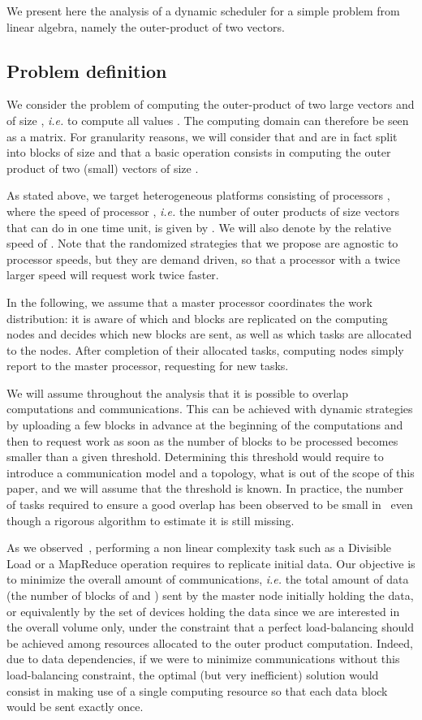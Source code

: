 \documentclass[a4paper,10pt]{article}
\newcommand{\ie}{{\it i.e.}\xspace}
\begin{document}
We present here the analysis of a dynamic scheduler for a simple
problem from linear algebra, namely the outer-product of two vectors.

\subsection{Problem definition}

We consider the problem of computing the outer-product  of two
large vectors  and  of size , \ie to compute all values . The computing domain can
therefore be seen as a matrix. For granularity reasons, we will
consider that  and  are in fact split into  blocks of size
 and that a basic operation consists in computing the outer product
of two (small) vectors of size .

As stated above, we target heterogeneous platforms consisting of 
processors , where the speed of processor , \ie
the number of outer products of size  vectors that  can do in
one time unit, is given by . We will also denote by
 the relative speed of . Note that the randomized strategies that we
propose are agnostic to processor speeds, but they are demand driven,
so that a processor with a twice larger speed will request work twice
faster.

In the following, we assume that a master processor coordinates the
work distribution: it is aware of which  and  blocks are
replicated on the computing nodes and decides which new blocks are
sent, as well as which tasks are allocated to the
nodes. After completion of their allocated tasks, computing nodes
simply report to the master processor, requesting for new tasks.


We will assume throughout the analysis that it is possible to overlap
computations and communications. This can be achieved with dynamic
strategies by uploading a few blocks in advance at the beginning of
the computations and then to request work as soon as the number of
blocks to be processed becomes smaller than a given
threshold. Determining this threshold would require to introduce a
communication model and a topology, what is out of the scope of this
paper, and we will assume that the threshold is known. In practice,
the number of tasks required to ensure a good overlap has been observed to be small
in~\cite{kreaseck2003autonomous,parashar2006autonomic} even though a
rigorous algorithm to estimate it is still missing.

As we observed~\cite{nofreelunch}, performing a non linear complexity
task such as a Divisible Load or a MapReduce operation requires to
replicate initial data. Our objective is to minimize the overall
amount of communications, \ie the total amount of data (the number of
blocks of  and ) sent by the master node initially holding the data,
or equivalently by the set of devices holding the data since we are
interested in the overall volume only, under the constraint that a
perfect load-balancing should be achieved among resources allocated to
the outer product computation. Indeed, due to data dependencies, if we
were to minimize communications without this load-balancing
constraint, the optimal (but very inefficient) solution would consist in
making use of a single computing resource so that each data block would be
sent exactly once.
\end{document}

